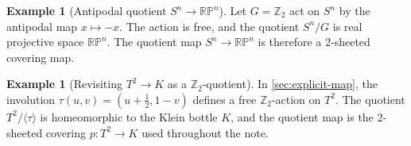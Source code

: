 \documentclass[11pt,a4paper]{article}
\theoremstyle{definition}
\newtheorem{example}[theorem]{Example}
\theoremstyle{remark}
\begin{document}
\begin{example}[Antipodal quotient \(S^n\to \mathbb{RP}^n\)]
\label{ex:sphere-to-projective}
Let \(G=\mathbb{Z}_2\) act on \(S^n\) by the antipodal map \(x\mapsto -x\). The action is free, and the quotient \(S^n/G\) is real projective space \(\mathbb{RP}^n\). The quotient map \(S^n\to \mathbb{RP}^n\) is therefore a 2-sheeted covering map.
\end{example}

\begin{example}[Revisiting \(T^2\to K\) as a \(\mathbb{Z}_2\)-quotient]
\label{ex:torus-klein-as-quotient}
In \cref{sec:explicit-map}, the involution \(\tau(u,v)=(u+\tfrac12,1-v)\) defines a free \(\mathbb{Z}_2\)-action on \(T^2\). The quotient \(T^2/\langle\tau\rangle\) is homeomorphic to the Klein bottle \(K\), and the quotient map is the 2-sheeted covering \(p:T^2\to K\) used throughout the note.
\end{example}
\end{document}
